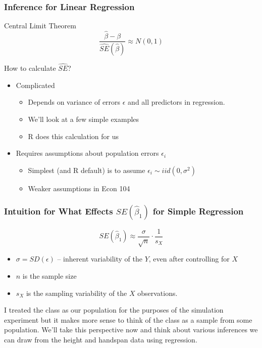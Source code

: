 \begin{frame}
\frametitle{Inference for Linear Regression}
	\begin{block}{Central Limit Theorem}
		$$\frac{\widehat{\beta} - \beta}{\widehat{SE}(\widehat{\beta})} \approx N(0,1)$$ 
\end{block}

\begin{block}{How to calculate $\widehat{SE}$?}
	\begin{itemize}
\item Complicated 
	\begin{itemize}
\item Depends on variance of errors $\epsilon$ and all predictors in regression. 
\item We'll look at a few simple examples 
\item R does this calculation for us 
\end{itemize}
\item Requires assumptions about population errors $\epsilon_i$ 
	\begin{itemize}
\item Simplest (and R default) is to assume $\epsilon_i \sim iid (0,\sigma^2)$ 
\item Weaker assumptions in Econ 104 
\end{itemize}

\end{itemize}
\end{block}

\end{frame}
\begin{frame}
\frametitle{Intuition for What Effects $SE(\widehat{\beta}_1)$ for Simple Regression}

	$$SE(\widehat{\beta}_1) \approx \frac{\sigma}{\sqrt{n}} \cdot \frac{1}{s_X}$$
	\begin{itemize}
	\item $\sigma = SD(\epsilon)$ -- inherent variability of the $Y$, even after controlling for $X$
	\item $n$ is the sample size
	\item $s_X$ is the sampling variability of the $X$ observations.
	\end{itemize}
\end{frame}


\begin{frame}
I treated the class as our population for the purposes of the simulation experiment but it makes more sense to think of the class as a sample from some population. We'll take this perspective now and think about various inferences we can draw from the height and handspan data using regression.
\end{frame}




